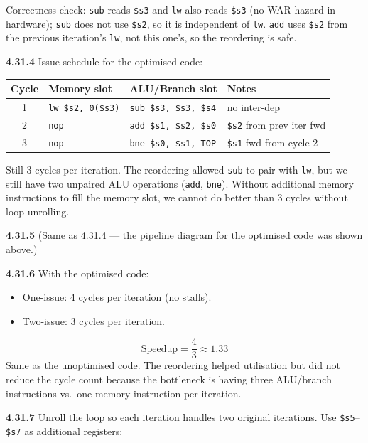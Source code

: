 \noindent Correctness check: \texttt{sub} reads \texttt{\$s3} and \texttt{lw}
also reads \texttt{\$s3} (no WAR hazard in hardware); \texttt{sub} does not
use \texttt{\$s2}, so it is independent of \texttt{lw}.  \texttt{add} uses
\texttt{\$s2} from the previous iteration's \texttt{lw}, not this one's, so
the reordering is safe.

\medskip\noindent\textbf{4.31.4}
Issue schedule for the optimised code:

\begin{center}
\begin{tabular}{clll}
\toprule
\textbf{Cycle} & \textbf{Memory slot} & \textbf{ALU/Branch slot} & \textbf{Notes} \\
\midrule
1 & \texttt{lw \$s2, 0(\$s3)} & \texttt{sub \$s3, \$s3, \$s4} & no inter-dep \\
2 & \texttt{nop} & \texttt{add \$s1, \$s2, \$s0} & \texttt{\$s2} from prev iter fwd \\
3 & \texttt{nop} & \texttt{bne \$s0, \$s1, TOP} & \texttt{\$s1} fwd from cycle 2 \\
\bottomrule
\end{tabular}
\end{center}

\noindent Still 3 cycles per iteration.  The reordering allowed \texttt{sub}
to pair with \texttt{lw}, but we still have two unpaired ALU operations
(\texttt{add}, \texttt{bne}).  Without additional memory instructions to fill
the memory slot, we cannot do better than 3 cycles without loop unrolling.

\medskip\noindent\textbf{4.31.5}
(Same as 4.31.4 --- the pipeline diagram for the optimised code was shown
above.)

\medskip\noindent\textbf{4.31.6}
With the optimised code:
\begin{itemize}
\item One-issue: 4 cycles per iteration (no stalls).
\item Two-issue: 3 cycles per iteration.
\end{itemize}
\[
\text{Speedup} = \frac{4}{3} \approx 1.33
\]
Same as the unoptimised code.  The reordering helped utilisation but did not
reduce the cycle count because the bottleneck is having three ALU/branch
instructions vs.\ one memory instruction per iteration.

\medskip\noindent\textbf{4.31.7}
Unroll the loop so each iteration handles two original iterations.  Use
\texttt{\$s5}--\texttt{\$s7} as additional registers:

